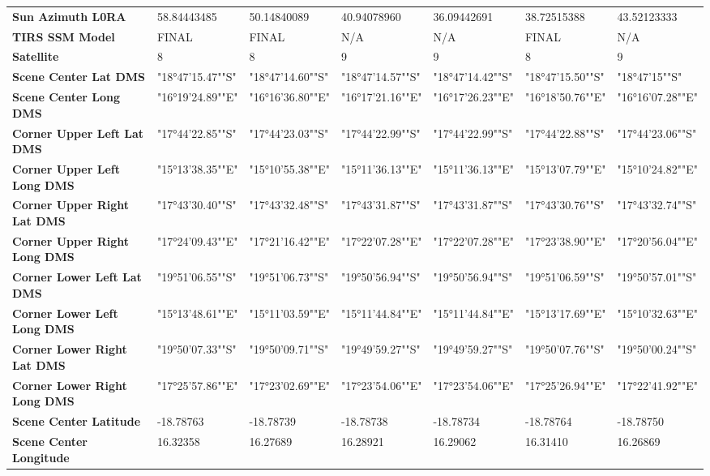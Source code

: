\documentclass[climate,article,submit,pdftex,moreauthors]{Definitions/mdpi}
\begin{document}
\begin{landscape}
\begin{table}
\begin{tabular}{|l|l|l|l|l|l|l|}
        \textbf{Sun Azimuth L0RA} & 58.84443485 & 50.14840089 & 40.94078960 & 36.09442691 & 38.72515388 & 43.52123333 \\
        \textbf{TIRS SSM Model} & FINAL & FINAL & N/A & N/A & FINAL & N/A \\
        \textbf{Satellite} & 8 & 8 & 9 & 9 & 8 & 9 \\
        \textbf{Scene Center Lat DMS} & "18°47'15.47""S" & "18°47'14.60""S" & "18°47'14.57""S" & "18°47'14.42""S" & "18°47'15.50""S" & "18°47'15""S" \\
        \textbf{Scene Center Long DMS} & "16°19'24.89""E" & "16°16'36.80""E" & "16°17'21.16""E" & "16°17'26.23""E" & "16°18'50.76""E" & "16°16'07.28""E" \\
        \textbf{Corner Upper Left Lat DMS} & "17°44'22.85""S" & "17°44'23.03""S" & "17°44'22.99""S" & "17°44'22.99""S" & "17°44'22.88""S" & "17°44'23.06""S" \\
        \textbf{Corner Upper Left Long DMS} & "15°13'38.35""E" & "15°10'55.38""E" & "15°11'36.13""E" & "15°11'36.13""E" & "15°13'07.79""E" & "15°10'24.82""E" \\
        \textbf{Corner Upper Right Lat DMS} & "17°43'30.40""S" & "17°43'32.48""S" & "17°43'31.87""S" & "17°43'31.87""S" & "17°43'30.76""S" & "17°43'32.74""S" \\
        \textbf{Corner Upper Right Long DMS} & "17°24'09.43""E" & "17°21'16.42""E" & "17°22'07.28""E" & "17°22'07.28""E" & "17°23'38.90""E" & "17°20'56.04""E" \\
        \textbf{Corner Lower Left Lat DMS} & "19°51'06.55""S" & "19°51'06.73""S" & "19°50'56.94""S" & "19°50'56.94""S" & "19°51'06.59""S" & "19°50'57.01""S" \\
        \textbf{Corner Lower Left Long DMS} & "15°13'48.61""E" & "15°11'03.59""E" & "15°11'44.84""E" & "15°11'44.84""E" & "15°13'17.69""E" & "15°10'32.63""E" \\
        \textbf{Corner Lower Right Lat DMS} & "19°50'07.33""S" & "19°50'09.71""S" & "19°49'59.27""S" & "19°49'59.27""S" & "19°50'07.76""S" & "19°50'00.24""S" \\
        \textbf{Corner Lower Right Long DMS} & "17°25'57.86""E" & "17°23'02.69""E" & "17°23'54.06""E" & "17°23'54.06""E" & "17°25'26.94""E" & "17°22'41.92""E" \\
        \textbf{Scene Center Latitude} & -18.78763 & -18.78739 & -18.78738 & -18.78734 & -18.78764 & -18.78750 \\
        \textbf{Scene Center Longitude} & 16.32358 & 16.27689 & 16.28921 & 16.29062 & 16.31410 & 16.26869 \\

\end{tabular}
\end{table}
\end{landscape}
\end{document}
